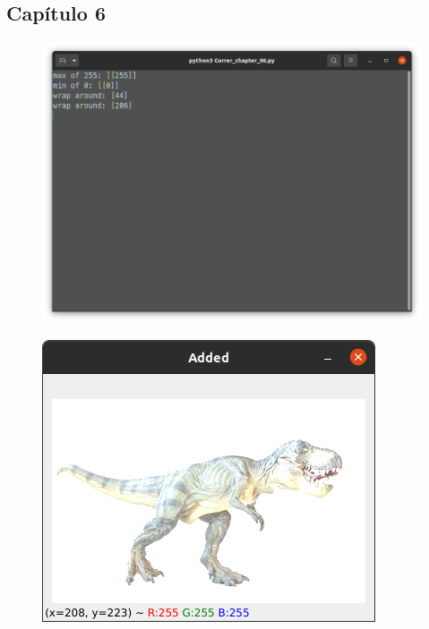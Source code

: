 \documentclass[12pt,letterpaper]{article}
\begin{document}
\begin{multicols}{2}

\section{Capítulo 6}

\begin{figure}[H]
\centering
\includegraphics[width = \columnwidth]{Terminal_ch6_1.png}
\end{figure}

\begin{figure}[H]
\centering
\includegraphics[width = \columnwidth]{Resultado1_ch6_1.png}
\end{figure}


\end{multicols}
\end{document}
